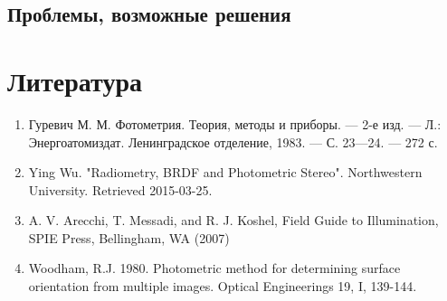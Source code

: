 \documentclass[12pt]{article}
\begin{document}
\subsection{Проблемы, возможные решения}

\section{Литература}
\begin{enumerate}
  \item Гуревич М. М. Фотометрия. Теория, методы и приборы. — 2-е изд. — Л.: Энергоатомиздат. Ленинградское отделение, 1983. — С. 23—24. — 272 с.
  \item Ying Wu. "Radiometry, BRDF and Photometric Stereo". Northwestern University. Retrieved 2015-03-25.
  \item A. V. Arecchi, T. Messadi, and R. J. Koshel, Field Guide to Illumination, SPIE Press, Bellingham, WA (2007)
  \item Woodham, R.J. 1980. Photometric method for determining surface orientation from multiple images. Optical Engineerings 19, I, 139-144.
\end{enumerate}
\end{document}
